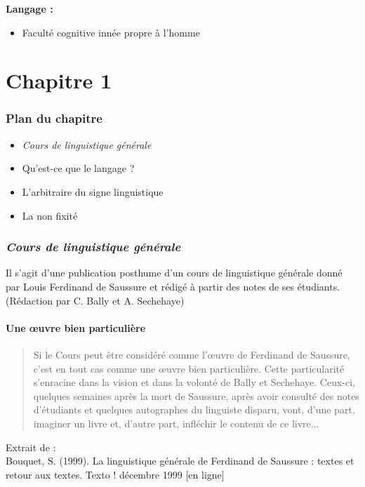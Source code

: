 \textbf{Langage :}
\begin{itemize}
   \item Faculté cognitive innée propre à l'homme
\end{itemize}

\newpage
\part{Chapitre 1}
\section*{Plan du chapitre}
\begin{itemize}
   \item \textit{Cours de linguistique générale}
   \item Qu'est-ce que le langage ?
   \item L'arbitraire du signe linguistique
   \item La non fixité
\end{itemize}

\section{\textit{Cours de linguistique générale}}
Il s'agit d'une publication posthume d'un cours de linguistique générale donné par Louis Ferdinand de Saussure et rédigé à partir des notes de ses étudiants. (Rédaction par C. Bally et A. Sechehaye)

\subsection{Une œuvre bien particulière}
\begin{quote}
      Si le Cours peut être considéré
comme l'œuvre de Ferdinand de
Saussure, c'est en tout cas comme
une œuvre bien particulière. Cette
particularité s'enracine dans la vision
et dans la volonté de Bally et
Sechehaye. Ceux-ci, quelques
semaines après la mort de Saussure,
après avoir consulté des notes
d'étudiants et quelques autographes
du linguiste disparu, vont, d'une
part, imaginer un livre et, d'autre
part, infléchir le contenu de ce
livre...
\end{quote}
Extrait de : \\
Bouquet, S. (1999). La linguistique
générale de Ferdinand de Saussure :
textes et retour aux textes. Texto !
décembre 1999 [en ligne]


